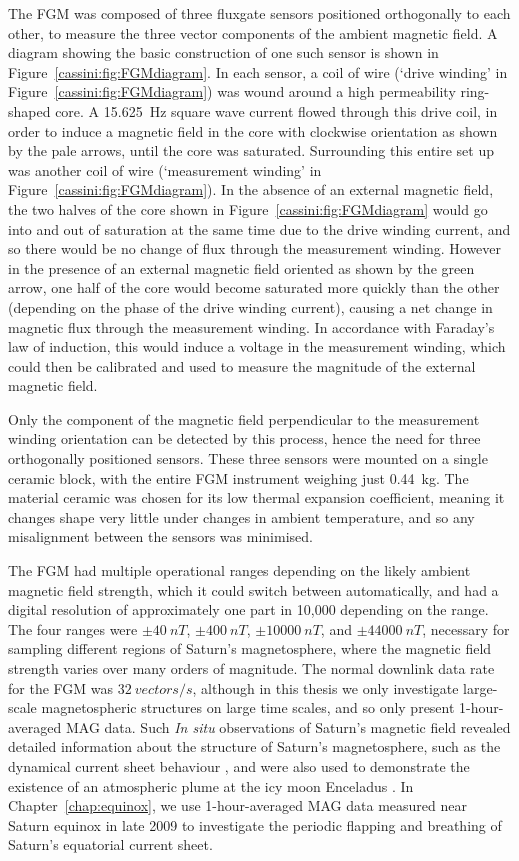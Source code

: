 The FGM was composed of three fluxgate sensors positioned orthogonally to each other, to measure the three vector components of the ambient magnetic field. A diagram showing the basic construction of one such sensor is shown in Figure~\ref{cassini:fig:FGMdiagram}. In each sensor, a coil of wire (`drive winding' in Figure~\ref{cassini:fig:FGMdiagram}) was wound around a high permeability ring-shaped core. A \SI{15.625}{\hertz} square wave current flowed through this drive coil, in order to induce a magnetic field in the core with clockwise orientation as shown by the pale arrows, until the core was saturated. Surrounding this entire set up was another coil of wire (`measurement winding' in Figure~\ref{cassini:fig:FGMdiagram}). In the absence of an external magnetic field, the two halves of the core shown in Figure~\ref{cassini:fig:FGMdiagram} would go into and out of saturation at the same time due to the drive winding current, and so there would be no change of flux through the measurement winding. However in the presence of an external magnetic field oriented as shown by the green arrow, one half of the core would become saturated more quickly than the other (depending on the phase of the drive winding current), causing a net change in magnetic flux through the measurement winding. In accordance with Faraday's law of induction, this would induce a voltage in the measurement winding, which could then be calibrated and used to measure the magnitude of the external magnetic field. 

Only the component of the magnetic field perpendicular to the measurement winding orientation can be detected by this process, hence the need for three orthogonally positioned sensors. These three sensors were mounted on a single ceramic block, with the entire FGM instrument weighing just \SI{0.44}{kg}. The material ceramic was chosen for its low thermal expansion coefficient, meaning it changes shape very little under changes in ambient temperature, and so any misalignment between the sensors was minimised.

The FGM had multiple operational ranges depending on the likely ambient magnetic field strength, which it could switch between automatically, and had a digital resolution of approximately one part in 10,000 depending on the range. The four ranges were $\pm\SI{40}{nT}$, $\pm\SI{400}{nT}$, $\pm\SI{10000}{nT}$, and $\pm\SI{44000}{nT}$, necessary for sampling different regions of Saturn's magnetosphere, where the magnetic field strength varies over many orders of magnitude. The normal downlink data rate for the FGM was $\SI{32}{vectors/s}$, although in this thesis we only investigate large-scale magnetospheric structures on large time scales, and so only present 1-hour-averaged MAG data. Such \textit{In situ} observations of Saturn's magnetic field revealed detailed information about the structure of Saturn's magnetosphere, such as the dynamical current sheet behaviour \citep[e.g.][]{provan2012}, and were also used to demonstrate the existence of an atmospheric plume at the icy moon Enceladus \citep{dougherty2006}. In Chapter~\ref{chap:equinox}, we use 1-hour-averaged MAG data measured near Saturn equinox in late 2009 to investigate the periodic flapping and breathing of Saturn's equatorial current sheet.

